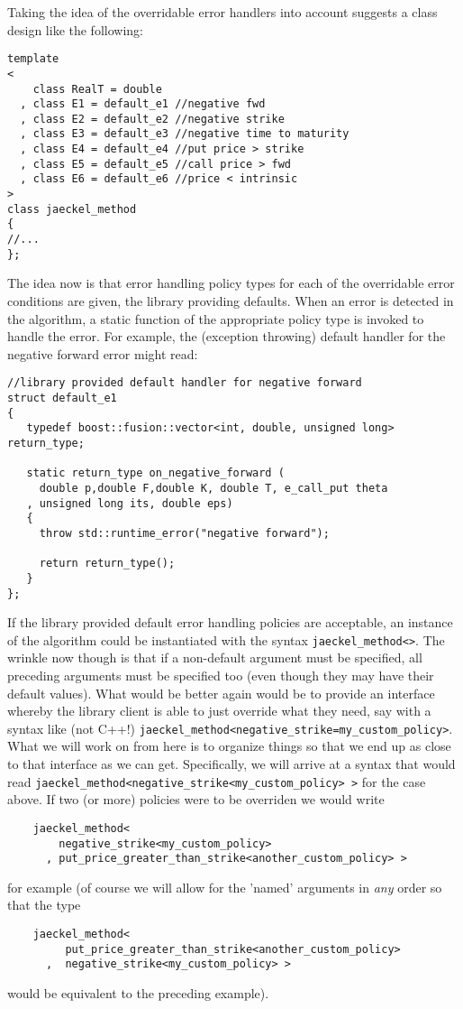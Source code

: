 \documentclass[a4paper,twoside,twocolumn]{article}
\begin{document}
Taking the idea of the overridable error handlers into account
suggests a class design like the following:
\begin{verbatim}
template 
<
    class RealT = double
  , class E1 = default_e1 //negative fwd
  , class E2 = default_e2 //negative strike
  , class E3 = default_e3 //negative time to maturity
  , class E4 = default_e4 //put price > strike
  , class E5 = default_e5 //call price > fwd
  , class E6 = default_e6 //price < intrinsic
>
class jaeckel_method
{
//...
};
\end{verbatim}
The idea now is that error handling policy types for each of the
overridable error conditions are given, the library providing
defaults. When an error is detected in the algorithm, a static
function of the appropriate policy type is invoked to handle the
error. For example, the (exception throwing) default handler for the
negative forward error might read:
\begin{verbatim}
//library provided default handler for negative forward
struct default_e1
{
   typedef boost::fusion::vector<int, double, unsigned long> return_type;
  
   static return_type on_negative_forward (
     double p,double F,double K, double T, e_call_put theta
   , unsigned long its, double eps)
   {
     throw std::runtime_error("negative forward");

     return return_type();
   }
};
\end{verbatim}
If the library provided default error handling policies are
acceptable, an instance of the algorithm could be instantiated with
the syntax \verb|jaeckel_method<>|. The wrinkle now though is that if
a non-default argument must be specified, all preceding arguments must
be specified too (even though they may have their default
values). What would be better again would be to provide an interface
whereby the library client is able to just override what they need,
say with a syntax like (not C++!)
\verb|jaeckel_method<negative_strike=my_custom_policy>|. What we will
work on from here is to organize things so that we end up as close to
that interface as we can get. Specifically, we will arrive at a syntax
that would read 
\verb|jaeckel_method<negative_strike<my_custom_policy> >|
for the case above. If two (or more) policies were to be overriden we
would write
\begin{verbatim}
    jaeckel_method<
        negative_strike<my_custom_policy>
      , put_price_greater_than_strike<another_custom_policy> >
\end{verbatim}
for example (of course we will allow for the 'named' arguments in
\emph{any} order so that the type
\begin{verbatim}
    jaeckel_method<
         put_price_greater_than_strike<another_custom_policy>
      ,  negative_strike<my_custom_policy> >
\end{verbatim}
would be equivalent to the preceding example).
\end{document}

